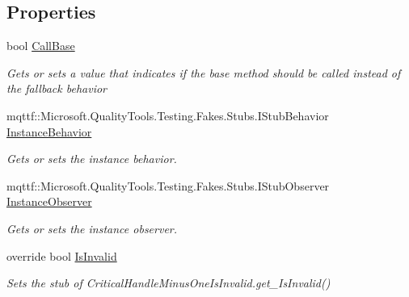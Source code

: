 \subsection*{Properties}
\begin{DoxyCompactItemize}
\item 
bool \hyperlink{class_microsoft_1_1_win32_1_1_safe_handles_1_1_fakes_1_1_stub_critical_handle_minus_one_is_invalid_aee88d8458a2cdafe1d93eba5ad2b8ef2}{Call\-Base}
\begin{DoxyCompactList}\small\item\em Gets or sets a value that indicates if the base method should be called instead of the fallback behavior\end{DoxyCompactList}\item 
mqttf\-::\-Microsoft.\-Quality\-Tools.\-Testing.\-Fakes.\-Stubs.\-I\-Stub\-Behavior \hyperlink{class_microsoft_1_1_win32_1_1_safe_handles_1_1_fakes_1_1_stub_critical_handle_minus_one_is_invalid_a22067e948f3c7c8cbe7fc14ef6976c64}{Instance\-Behavior}
\begin{DoxyCompactList}\small\item\em Gets or sets the instance behavior.\end{DoxyCompactList}\item 
mqttf\-::\-Microsoft.\-Quality\-Tools.\-Testing.\-Fakes.\-Stubs.\-I\-Stub\-Observer \hyperlink{class_microsoft_1_1_win32_1_1_safe_handles_1_1_fakes_1_1_stub_critical_handle_minus_one_is_invalid_ab848b09dee9cd2b0c760deab9d1803ce}{Instance\-Observer}
\begin{DoxyCompactList}\small\item\em Gets or sets the instance observer.\end{DoxyCompactList}\item 
override bool \hyperlink{class_microsoft_1_1_win32_1_1_safe_handles_1_1_fakes_1_1_stub_critical_handle_minus_one_is_invalid_afc1630eaeaf55919e7b6cc7faadeba3c}{Is\-Invalid}
\begin{DoxyCompactList}\small\item\em Sets the stub of Critical\-Handle\-Minus\-One\-Is\-Invalid.\-get\-\_\-\-Is\-Invalid()\end{DoxyCompactList}\end{DoxyCompactItemize}


